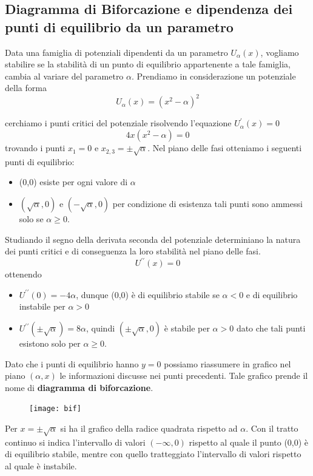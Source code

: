\subsection{Diagramma di Biforcazione e dipendenza dei punti di equilibrio da un parametro}

Data una famiglia di potenziali dipendenti da un parametro $U_{\alpha}(x)$, vogliamo stabilire se la stabilit\`{a} di un punto di equilibrio appartenente a tale famiglia, cambia al variare del parametro $\alpha$. Prendiamo in considerazione un potenziale della forma 
\begin{equation}
	U_{\alpha}(x) = (x^2-\alpha)^2
\end{equation}
\newpage 

cerchiamo i punti critici del potenziale risolvendo l'equazione $U_{\alpha}^{\prime}(x) = 0$
\begin{equation*}
	4x(x^2 - \alpha)= 0 
\end{equation*}
trovando i punti $x_1 = 0 $ e $x_{2,3} = \pm \sqrt{\alpha}$. Nel piano delle fasi otteniamo i seguenti punti di equilibrio:
\begin{itemize}
	\item (0,0) esiste per ogni valore di $\alpha$ 
	\item $(\sqrt{\alpha},0)$ e $(-\sqrt{\alpha},0)$ per condizione di esistenza tali punti sono ammessi solo se $\alpha \geq 0$.
\end{itemize}
Studiando il segno della derivata seconda del potenziale determiniano la natura dei punti critici e di conseguenza la loro stabilit\`{a} nel piano delle fasi.
\begin{equation*}
	U^{\prime \prime}(x) = 0 
\end{equation*}
ottenendo
\begin{itemize}
	\item $U^{\prime \prime}(0) = - 4 \alpha $, dunque (0,0) \`{e} di equilibrio stabile se $\alpha <0$ e di equilibrio instabile per $\alpha > 0$
	\item $U^{\prime \prime}(\pm \sqrt{\alpha}) = 8\alpha$, quindi $(\pm\sqrt{\alpha},0)$ \`{e} stabile per $\alpha > 0$ dato che tali punti esistono solo per $\alpha \geq 0$.
\end{itemize}
Dato che i punti di equilibrio hanno $y = 0$ possiamo riassumere in grafico nel piano $(\alpha,x)$ le informazioni discusse nei punti precedenti. Tale grafico prende il nome di \textbf{diagramma di biforcazione}.

\begin{figure}
\vspace{-0.4in}
  \begin{center}
    \texttt{[image: bif]}
  \end{center}
\end{figure}
\vspace{0.3in}
\noindent Per $x = \pm \sqrt{\alpha}$ si ha il grafico della radice quadrata rispetto ad $\alpha$. Con il tratto continuo si indica l'intervallo di valori $(-\infty, 0)$ rispetto al quale il punto (0,0) \`{e} di equilibrio stabile, mentre con quello tratteggiato l'intervallo di valori rispetto al quale \`{e} instabile.  
\newpage 

